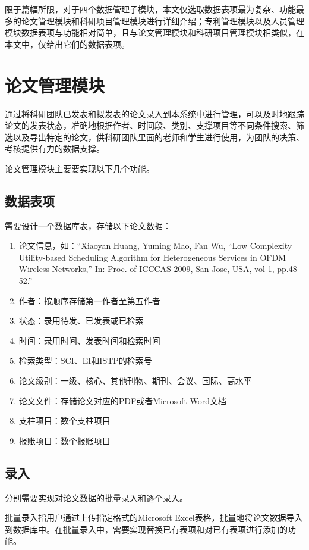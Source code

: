 限于篇幅所限，对于四个数据管理子模块，本文仅选取数据表项最为复杂、功能最多的论文管理模块和科研项目管理模块进行详细介绍；专利管理模块以及人员管理模块数据表项与功能相对简单，且与论文管理模块和科研项目管理模块相类似，在本文中，仅给出它们的数据表项。
\section{论文管理模块}

通过将科研团队已发表和拟发表的论文录入到本系统中进行管理，可以及时地跟踪论文的发表状态，准确地根据作者、时间段、类别、支撑项目等不同条件搜索、筛选以及导出特定的论文，供科研团队里面的老师和学生进行使用，为团队的决策、考核提供有力的数据支撑。

论文管理模块主要要实现以下几个功能。

\subsection{数据表项}
需要设计一个数据库表，存储以下论文数据：
\begin{enumerate}
\item 论文信息，如：“Xiaoyan Huang, Yuming Mao, Fan Wu, ``Low Complexity Utility-based Scheduling Algorithm for Heterogeneous Services in OFDM Wireless Networks,'' In: Proc. of ICCCAS 2009, San Jose, USA, vol 1, pp.48-52.”
\item 作者：按顺序存储第一作者至第五作者
\item 状态：录用待发、已发表或已检索
\item 时间：录用时间、发表时间和检索时间
\item 检索类型：SCI、EI和ISTP的检索号
\item 论文级别：一级、核心、其他刊物、期刊、会议、国际、高水平
\item 论文文件：存储论文对应的PDF或者Microsoft Word文档
\item 支柱项目：数个支柱项目
\item 报账项目：数个报账项目
\end{enumerate}

\subsection{录入}
分别需要实现对论文数据的批量录入和逐个录入。

批量录入指用户通过上传指定格式的Microsoft Excel表格，批量地将论文数据导入到数据库中。在批量录入中，需要实现替换已有表项和对已有表项进行添加的功能。

